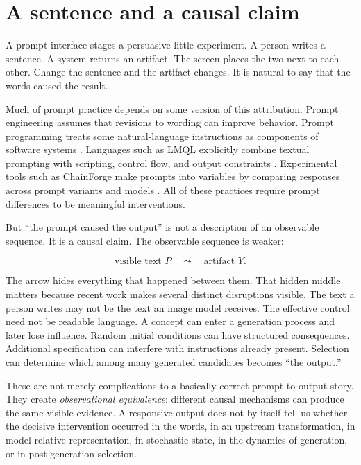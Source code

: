\documentclass[11pt]{article}
\begin{document}
\section{A sentence and a causal claim}

A prompt interface stages a persuasive little experiment. A person writes a sentence. A system returns an artifact. The screen places the two next to each other. Change the sentence and the artifact changes. It is natural to say that the words caused the result.

Much of prompt practice depends on some version of this attribution. Prompt engineering assumes that revisions to wording can improve behavior. Prompt programming treats some natural-language instructions as components of software systems \citep{Liang2025PromptsPrograms}. Languages such as LMQL explicitly combine textual prompting with scripting, control flow, and output constraints \citep{BeurerKellner2023LMQL}. Experimental tools such as ChainForge make prompts into variables by comparing responses across prompt variants and models \citep{Arawjo2023ChainForge}. All of these practices require prompt differences to be meaningful interventions.

But ``the prompt caused the output'' is not a description of an observable sequence. It is a causal claim. The observable sequence is weaker:

\[
\text{visible text } P \quad \leadsto \quad \text{artifact } Y.
\]

The arrow hides everything that happened between them. That hidden middle matters because recent work makes several distinct disruptions visible. The text a person writes may not be the text an image model receives. The effective control need not be readable language. A concept can enter a generation process and later lose influence. Random initial conditions can have structured consequences. Additional specification can interfere with instructions already present. Selection can determine which among many generated candidates becomes ``the output.''

These are not merely complications to a basically correct prompt-to-output story. They create \emph{observational equivalence}: different causal mechanisms can produce the same visible evidence. A responsive output does not by itself tell us whether the decisive intervention occurred in the words, in an upstream transformation, in model-relative representation, in stochastic state, in the dynamics of generation, or in post-generation selection.
\end{document}

